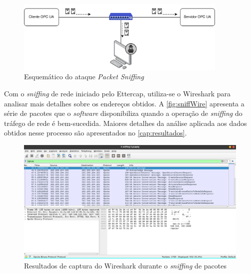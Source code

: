         \begin{figure}[htbp]
            \caption{\label{fig:sniffing}Esquemático do ataque \textit{Packet Sniffing}}
            \begin{center}
                \includegraphics[width=0.9\textwidth]{USPSC-img/sniffing.png}
            \end{center}
        \end{figure}
        
        Com o \textit{sniffing} de rede iniciado pelo Ettercap, utiliza-se o Wireshark para analisar mais detalhes sobre os endereços obtidos. A \autoref{fig:sniffWire} apresenta a série de pacotes que o \textit{software} disponibiliza quando a operação de \textit{sniffing} do tráfego de rede é bem-sucedida. Maiores detalhes da análise aplicada aos dados obtidos nesse processo são apresentados no \autoref{cap:resultados}.

        \begin{figure}[htbp]
            \caption{\label{fig:sniffWire}Resultados de captura do Wireshark durante o \textit{sniffing} de pacotes}
            \begin{center}
                \includegraphics[width=1\textwidth]{USPSC-img/sniffWire.png}
            \end{center}
        \end{figure}
        
